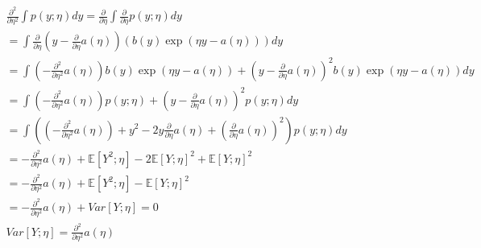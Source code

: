 \begin{answer}
\begin{eqnarray*}
\frac{\partial^2}{\partial \eta^2} \int p(y;\eta) dy =\frac{\partial}{\partial \eta}\int\frac{\partial}{\partial \eta} p(y;\eta) dy\\
=\int\frac{\partial}{\partial \eta}\left(y-\frac{\partial}{\partial \eta}a(\eta)\right)\left(b(y)\exp(\eta y - a(\eta))\right) dy\\
=\int\left(-\frac{\partial^2}{\partial\eta^2}a(\eta)\right)b(y)\exp(\eta y - a(\eta))+\left(y-\frac{\partial}{\partial \eta}a(\eta)\right)^2b(y)\exp(\eta y - a(\eta))dy\\
=\int\left(-\frac{\partial^2}{\partial\eta^2}a(\eta)\right)p(y;\eta)+\left(y-\frac{\partial}{\partial \eta}a(\eta)\right)^2p(y;\eta)dy\\
=\int\left(\left(-\frac{\partial^2}{\partial\eta^2}a(\eta)\right)+y^2-2y\frac{\partial}{\partial \eta}a(\eta)+\left(\frac{\partial}{\partial \eta}a(\eta)\right)^2\right)p(y;\eta)dy\\
=-\frac{\partial^2}{\partial\eta^2}a(\eta)+\mathbb{E}[Y^2; \eta]-2\mathbb{E}[Y; \eta]^2+\mathbb{E}[Y; \eta]^2\\
=-\frac{\partial^2}{\partial\eta^2}a(\eta)+\mathbb{E}[Y^2; \eta]-\mathbb{E}[Y; \eta]^2\\
=-\frac{\partial^2}{\partial\eta^2}a(\eta)+Var[Y; \eta]=0
\\
Var[Y; \eta]=\frac{\partial^2}{\partial \eta^2}a(\eta)
\end{eqnarray*}
\end{answer}
